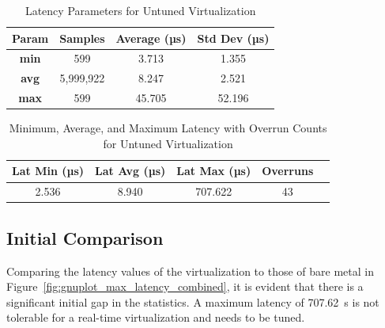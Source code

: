 \documentclass[MMR,Master,english]{twbook}
\begin{document}
\begin{table}[H]
	\centering
	\caption{Latency Parameters for Untuned Virtualization}
	\label{tab:latency_stats_virt}
	\begin{tabular}{|c|c|c|c|}
		\hline
		\textbf{Param} & \textbf{Samples} & \textbf{Average (µs)} & \textbf{Std Dev (µs)} \\ \hline
		\textbf{min}   & 599              & 3.713                 & 1.355                 \\ \hline
		\textbf{avg}   & 5,999,922        & 8.247                 & 2.521                 \\ \hline
		\textbf{max}   & 599              & 45.705                & 52.196                \\ \hline
	\end{tabular}
\end{table}

\begin{table}[H]
	\centering
	\caption[Latency Statistics with Overrun Counts for Untuned Virtualization]{Minimum, Average, and Maximum Latency with Overrun Counts for Untuned Virtualization}
	\label{tab:latency_overrun_msw_new_virt}
	\begin{tabular}{|c|c|c|c|c|}
		\hline
		\textbf{Lat Min (µs)} & \textbf{Lat Avg (µs)} & \textbf{Lat Max (µs)} & \textbf{Overruns} \\ \hline
		2.536                 & 8.940                 & 707.622               & 43                \\ \hline
	\end{tabular}
\end{table}

\subsection{Initial Comparison}
\noindent Comparing the latency values of the virtualization to those of bare metal in Figure~\ref{fig:gnuplot_max_latency_combined}, it is evident that there is a significant initial gap in the statistics. A maximum latency of 707.62~\textmu s is not tolerable for a real-time virtualization and needs to be tuned.
\end{document}
